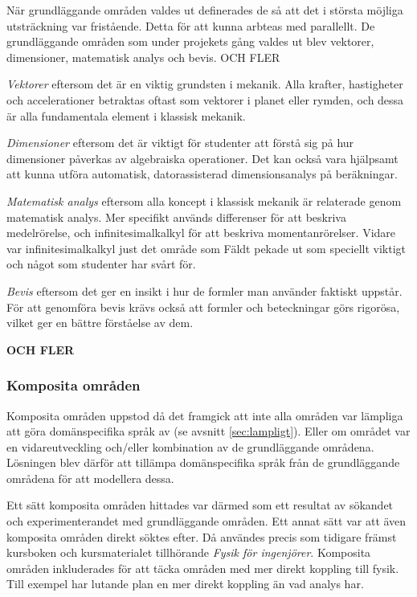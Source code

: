 \begin{binge}
När grundläggande områden valdes ut definerades de så att det i största möjliga
utsträckning var fristående. Detta för att kunna arbteas med parallellt. De
grundläggande områden som under projekets gång valdes ut blev vektorer,
dimensioner, matematisk analys och bevis. OCH FLER

\textit{Vektorer} eftersom det är en viktig grundsten i mekanik. Alla krafter,
hastigheter och accelerationer betraktas oftast som vektorer i planet eller
rymden, och dessa är alla fundamentala element i klassisk mekanik.

\textit{Dimensioner} eftersom det är viktigt för studenter att förstå sig på
hur dimensioner påverkas av algebraiska operationer. Det kan också vara
hjälpsamt att kunna utföra automatisk, datorassisterad dimensionsanalys på
beräkningar.

\textit{Matematisk analys} eftersom alla koncept i klassisk mekanik är
relaterade genom matematisk analys. Mer specifikt används differenser för att
beskriva medelrörelse, och infinitesimalkalkyl för att beskriva
momentanrörelser. Vidare var infinitesimalkalkyl just det område som Fäldt
pekade ut som speciellt viktigt och något som studenter har svårt för.

\textit{Bevis} eftersom det ger en insikt i hur de formler man använder
faktiskt uppstår. För att genomföra bevis krävs också att formler och
beteckningar görs rigorösa, vilket ger en bättre förståelse av dem.

\textbf{OCH FLER}
  
\subsubsection{Komposita områden}
\label{sec:selektion_komposit}

Komposita områden uppstod då det framgick att inte alla områden var lämpliga
att göra domänspecifika språk av (se avsnitt \ref{sec:lampligt}). Eller om
området var en vidareutveckling och/eller kombination av de grundläggande
områdena. Lösningen blev därför att tillämpa domänspecifika språk från de
grundläggande områdena för att modellera dessa.

Ett sätt komposita områden hittades var därmed som ett resultat av sökandet och
experimenterandet med grundläggande områden. Ett annat sätt var att även
komposita områden direkt söktes efter. Då användes precis som tidigare främst
kursboken och kursmaterialet tillhörande \textit{Fysik för ingenjörer}.
Komposita områden inkluderades för att täcka områden med mer direkt koppling
till fysik. Till exempel har lutande plan en mer direkt koppling än vad analys
har.


\end{binge}
